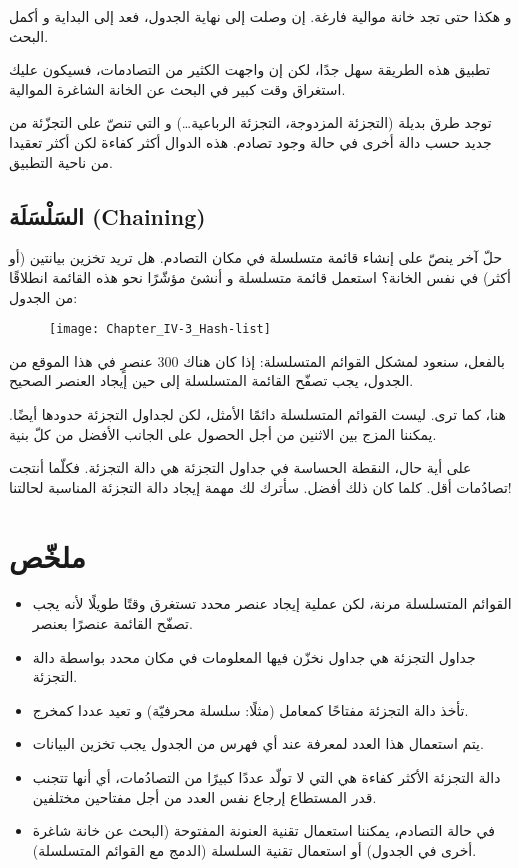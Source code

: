 و هكذا حتى تجد خانة موالية فارغة. إن وصلت إلى نهاية الجدول، فعد إلى البداية و أكمل البحث.

تطبيق هذه الطريقة سهل جدًا، لكن إن واجهت الكثير من التصادمات، فسيكون عليك استغراق وقت كبير في البحث عن الخانة الشاغرة الموالية.

توجد طرق بديلة (التجزئة المزدوجة، التجزئة الرباعية\dots) و التي تنصّ على التجزّئة من جديد حسب دالة أخرى في حالة وجود تصادم. هذه الدوال أكثر كفاءة لكن أكثر تعقيدا من ناحية التطبيق.

\subsection{السَلْسَلَة (\textenglish{Chaining})}

حلّ آخر ينصّ على إنشاء قائمة متسلسلة في مكان التصادم. هل تريد تخزين بيانتين (أو أكثر) في نفس الخانة؟ استعمل قائمة متسلسلة و أنشئ مؤشّرًا نحو هذه القائمة انطلاقًا من الجدول:

\begin{figure}[H]
	\centering
	\texttt{[image: Chapter\_IV-3\_Hash-list]}
\end{figure}

بالفعل، سنعود لمشكل القوائم المتسلسلة: إذا كان هناك 300 عنصرٍ في هذا الموقع من الجدول، يجب تصفّح القائمة المتسلسلة إلى حين إيجاد العنصر الصحيح.

هنا، كما ترى. ليست القوائم المتسلسلة دائمًا الأمثل، لكن لجداول التجزئة حدودها أيضًا. يمكننا المزج بين الاثنين من أجل الحصول على الجانب الأفضل من كلّ بنية.

على أية حال، النقطة الحساسة في جداول التجزئة هي دالة التجزئة. فكلّما أنتجت تصادُمات أقل. كلما كان ذلك أفضل.
سأترك لك مهمة إيجاد دالة التجزئة المناسبة لحالتنا!

\section*{ملخّص}

\begin{itemize}
	\item القوائم المتسلسلة مرنة، لكن عملية إيجاد عنصر محدد تستغرق وقتًا طويلًا لأنه يجب تصفّح القائمة عنصرًا بعنصر.
	\item جداول التجزئة هي جداول نخزّن فيها المعلومات في مكان محدد بواسطة دالة التجزئة.
	\item تأخذ دالة التجزئة مفتاحًا كمعامل (مثلًا: سلسلة محرفيّة) و تعيد عددا كمخرج.
	\item يتم استعمال هذا العدد لمعرفة عند أي فهرس من الجدول يجب تخزين البيانات.
	\item دالة التجزئة الأكثر كفاءة هي التي لا تولّد عددًا كبيرًا من التصادُمات، أي أنها تتجنب قدر المستطاع إرجاع نفس العدد من أجل مفتاحين مختلفين.
	\item في حالة التصادم، يمكننا استعمال تقنية العنونة المفتوحة (البحث عن خانة شاغرة أخرى في الجدول) أو استعمال تقنية السلسلة (الدمج مع القوائم المتسلسلة).
\end{itemize}
